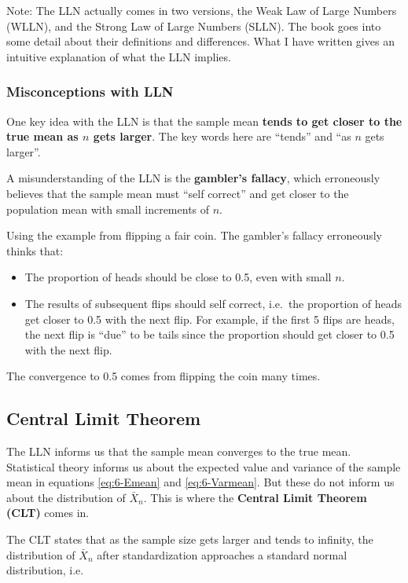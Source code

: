 \documentclass[
]{book}
\providecommand{\tightlist}{%
  \setlength{\itemsep}{0pt}\setlength{\parskip}{0pt}}
\begin{document}
Note: The LLN actually comes in two versions, the Weak Law of Large Numbers (WLLN), and the Strong Law of Large Numbers (SLLN). The book goes into some detail about their definitions and differences. What I have written gives an intuitive explanation of what the LLN implies.

\subsubsection{Misconceptions with LLN}\label{misconceptions-with-lln}

One key idea with the LLN is that the sample mean \textbf{tends to get closer to the true mean as \(n\) gets larger}. The key words here are ``tends'' and ``as \(n\) gets larger''.

A misunderstanding of the LLN is the \textbf{gambler's fallacy}, which erroneously believes that the sample mean must ``self correct'' and get closer to the population mean with small increments of \(n\).

Using the example from flipping a fair coin. The gambler's fallacy erroneously thinks that:

\begin{itemize}
\tightlist
\item
  The proportion of heads should be close to 0.5, even with small \(n\).
\item
  The results of subsequent flips should self correct, i.e.~the proportion of heads get closer to 0.5 with the next flip. For example, if the first 5 flips are heads, the next flip is ``due'' to be tails since the proportion should get closer to 0.5 with the next flip.
\end{itemize}

The convergence to 0.5 comes from flipping the coin many times.

\subsection{Central Limit Theorem}\label{central-limit-theorem}

The LLN informs us that the sample mean converges to the true mean. Statistical theory informs us about the expected value and variance of the sample mean in equations \eqref{eq:6-Emean} and \eqref{eq:6-Varmean}. But these do not inform us about the distribution of \(\bar{X}_n\). This is where the \textbf{Central Limit Theorem (CLT)} comes in.

The CLT states that as the sample size gets larger and tends to infinity, the distribution of \(\bar{X}_n\) after standardization approaches a standard normal distribution, i.e.
\end{document}

